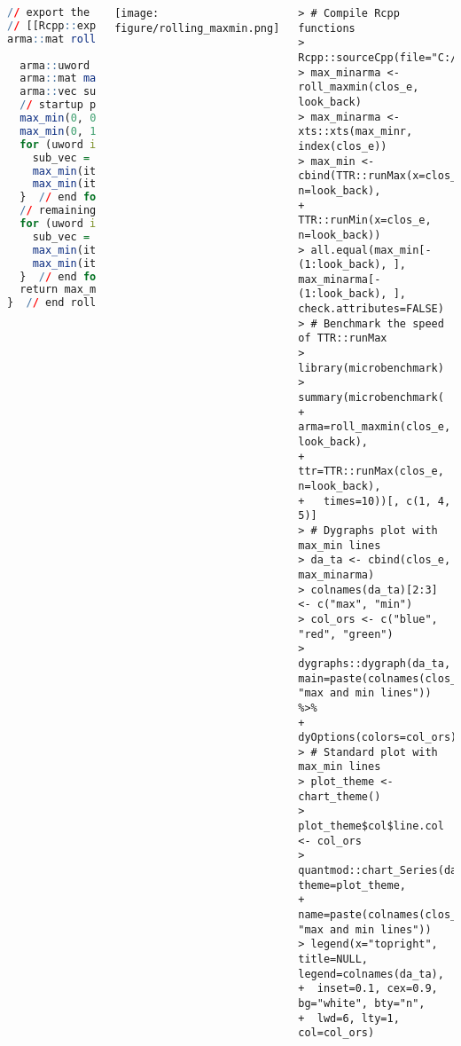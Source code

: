 \documentclass[10pt]{beamer}\usepackage[]{graphicx}\usepackage[]{color}
\makeatletter
\newenvironment{kframe}{%
 \def\at@end@of@kframe{}%
 \ifinner\ifhmode%
  \def\at@end@of@kframe{\end{minipage}}%
  \begin{minipage}{\columnwidth}%
 \fi\fi%
 \def\FrameCommand##1{\hskip\@totalleftmargin \hskip-\fboxsep
 \colorbox{shadecolor}{##1}\hskip-\fboxsep
     \hskip-\linewidth \hskip-\@totalleftmargin \hskip\columnwidth}%
 \MakeFramed {\advance\hsize-\width
   \@totalleftmargin\z@ \linewidth\hsize
   \@setminipage}}%
 {\par\unskip\endMakeFramed%
 \at@end@of@kframe}
\newenvironment{knitrout}{}{} %
\makeatother
\begin{document}
\begin{frame}[fragile,t]{\subsecname}
\begin{block}{}
\begin{columns}[T]
\begin{lstlisting}[language=R,basicstyle=\tiny\ttfamily\bfseries,backgroundcolor=\color{anti_flashwhite},showstringspaces=FALSE]
// export the function roll_maxmin() to R
// [[Rcpp::export]]
arma::mat roll_maxmin(const arma::vec& vec_tor,
                      const arma::uword& look_back) {
  arma::uword n_rows = vec_tor.size();
  arma::mat max_min(n_rows, 2);
  arma::vec sub_vec;
  // startup period
  max_min(0, 0) = vec_tor[0];
  max_min(0, 1) = vec_tor[0];
  for (uword it = 1; it < look_back; it++) {
    sub_vec = vec_tor.subvec(0, it);
    max_min(it, 0) = sub_vec.max();
    max_min(it, 1) = sub_vec.min();
  }  // end for
  // remaining periods
  for (uword it = look_back; it < n_rows; it++) {
    sub_vec = vec_tor.subvec(it- look_back + 1, it);
    max_min(it, 0) = sub_vec.max();
    max_min(it, 1) = sub_vec.min();
  }  // end for
  return max_min;
}  // end roll_maxmin
    \end{lstlisting}
      \texttt{[image: figure/rolling\_maxmin.png]}
      \vspace{-1em}
\begin{knitrout}\tiny
{}\color{fgcolor}\begin{kframe}
\begin{verbatim}
> # Compile Rcpp functions
> Rcpp::sourceCpp(file="C:/Develop/R/Rcpp/roll_maxmin.cpp")
> max_minarma <- roll_maxmin(clos_e, look_back)
> max_minarma <- xts::xts(max_minr, index(clos_e))
> max_min <- cbind(TTR::runMax(x=clos_e, n=look_back),
+            TTR::runMin(x=clos_e, n=look_back))
> all.equal(max_min[-(1:look_back), ], max_minarma[-(1:look_back), ], check.attributes=FALSE)
> # Benchmark the speed of TTR::runMax
> library(microbenchmark)
> summary(microbenchmark(
+   arma=roll_maxmin(clos_e, look_back),
+   ttr=TTR::runMax(clos_e, n=look_back),
+   times=10))[, c(1, 4, 5)]
> # Dygraphs plot with max_min lines
> da_ta <- cbind(clos_e, max_minarma)
> colnames(da_ta)[2:3] <- c("max", "min")
> col_ors <- c("blue", "red", "green")
> dygraphs::dygraph(da_ta, main=paste(colnames(clos_e), "max and min lines")) %>%
+   dyOptions(colors=col_ors)
> # Standard plot with max_min lines
> plot_theme <- chart_theme()
> plot_theme$col$line.col <- col_ors
> quantmod::chart_Series(da_ta["2008/2009"], theme=plot_theme,
+   name=paste(colnames(clos_e), "max and min lines"))
> legend(x="topright", title=NULL, legend=colnames(da_ta),
+  inset=0.1, cex=0.9, bg="white", bty="n",
+  lwd=6, lty=1, col=col_ors)
\end{verbatim}
\end{kframe}
\end{knitrout}
  \end{columns}
\end{block}

\end{frame}
\end{document}
